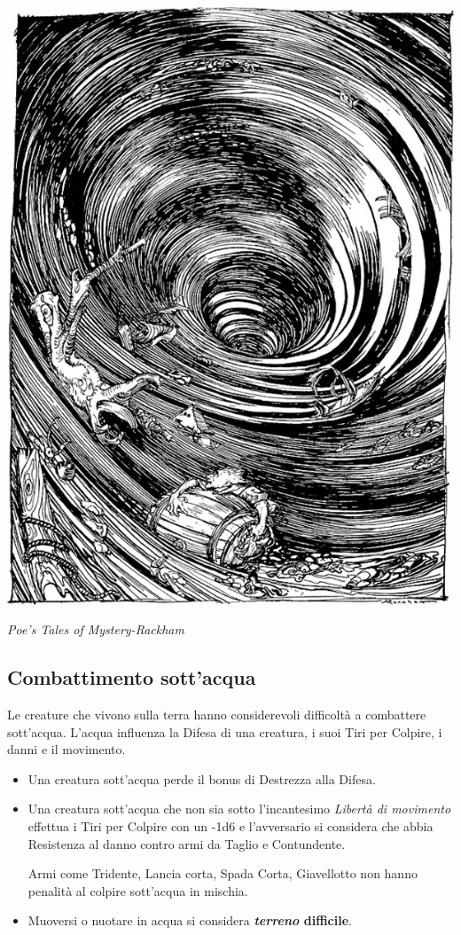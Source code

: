 \begin{multicols}{2}
\begin{center}
\includegraphics[width=0.75\linewidth]{immagini/Poe's_Tales_of_Mystery-Rackham-047_grayscale.png}

\emph{Poe's Tales of Mystery-Rackham}
\end{center}

\subsection{Combattimento sott'acqua}\label{combatteresottacqua}\hypertarget{combatteresottacqua}{}
Le creature che vivono sulla terra hanno considerevoli difficoltà a combattere sott'acqua. L'acqua influenza la Difesa di una creatura, i suoi Tiri per Colpire, i danni e il movimento.

\begin{itemize}[leftmargin=*] \setlength{\itemsep}{0pt}
\item
Una creatura sott'acqua perde il bonus di Destrezza alla Difesa.
\item
Una creatura sott'acqua che non sia sotto l'incantesimo \emph{Libertà di movimento} effettua i Tiri per Colpire con un -1d6 e l'avversario si considera che abbia Resistenza al danno contro armi da Taglio e Contundente.

Armi come Tridente, Lancia corta, Spada Corta, Giavellotto non hanno penalità al colpire sott'acqua in mischia.
\item
Muoversi o nuotare in acqua si considera \textbf{\emph{terreno} difficile}.
\end{itemize}


\end{multicols}
